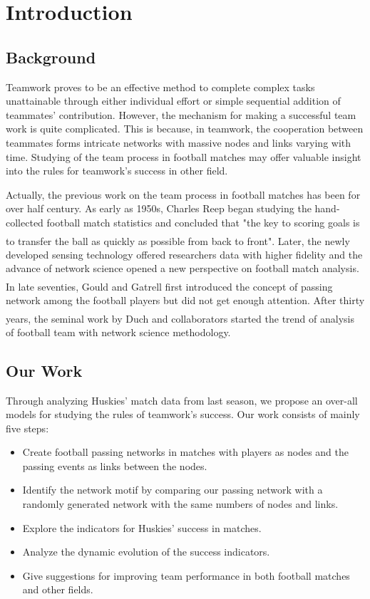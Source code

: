 \documentclass[12pt]{article}
\newcommand{\upcite}[1]{\textsuperscript{\textsuperscript{\cite{#1}}}}
\begin{document}
\section{Introduction}
\subsection{Background}
Teamwork proves to be an effective method to complete complex tasks unattainable through either individual effort or simple sequential addition of teammates' contribution. However, the mechanism for making a successful team work is quite complicated. This is because, in teamwork, the cooperation between teammates forms intricate networks with massive nodes and links varying with time. Studying of the team process in football matches may offer valuable insight into the rules for teamwork's success in other field.

Actually, the previous work on the team process in football matches has been for over half century. As early as 1950s, Charles Reep began studying the hand-collected football match statistics and concluded that "the key to scoring goals is to transfer the ball as quickly as possible from back to front"\upcite{reep1968skill}. Later, the newly developed sensing technology offered researchers data with higher fidelity and the advance of network science opened a new perspective on football match analysis. In late seventies, Gould and Gatrell\upcite{gould1979structural} first introduced the concept of passing network among the football players but did not get enough attention. After thirty years, the seminal work by Duch and collaborators\upcite{duch2010quantifying} started the trend of analysis of football team with network science methodology.


\subsection{Our Work}
Through analyzing Huskies' match data from last season, we propose an over-all models for studying the rules of teamwork's success. Our work consists of mainly five steps:
\begin{itemize}
    \item Create football passing networks in matches with players as nodes and the passing events as links between the nodes.
    \item Identify the network motif by comparing our passing network with a randomly generated network with the same numbers of nodes and links.
    \item Explore the indicators for Huskies' success in matches.
    \item Analyze the dynamic evolution of the success indicators.
    \item Give suggestions for improving team performance in both football matches and other fields.
\end{itemize}
\end{document}
